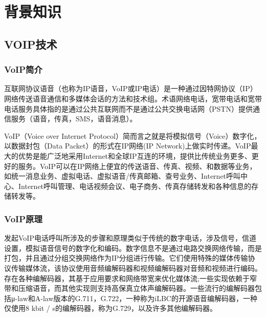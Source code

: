 \documentclass[a4paper,AutoFakeBold,oneside,12pt]{book}
\begin{document}
\blankmatter


% 

% 

% 

\frontmatter\tableofcontents %

\newpage\mainmatter
{}

\chapter{背景知识}

\section{VOIP技术}
\subsection{VoIP简介}
互联网协议语音（也称为IP语音，VoIP或IP电话）是一种通过因特网协议（IP）网络传送语音通信和多媒体会话的方法和技术组。术语网络电话，宽带电话和宽带电话服务具体指的是通过公共互联网而不是通过公共交换电话网（PSTN）提供通信服务（语音，传真，SMS，语音消息）。

VoIP（Voice over Internet Protocol）简而言之就是将模拟信号（Voice）数字化，以数据封包（Data Packet）的形式在IP网络(IP Network)上做实时传递。VoIP最大的优势是能广泛地采用Internet和全球IP互连的环境，提供比传统业务更多、更好的服务。VoIP可以在IP网络上便宜的传送语音、传真、视频、和数据等业务，如统一消息业务、虚拟电话、虚拟语音/传真邮箱、查号业务、Internet呼叫中心、Internet呼叫管理、电话视频会议、电子商务、传真存储转发和各种信息的存储转发等。

\subsection{VoIP原理}
发起VoIP电话呼叫所涉及的步骤和原理类似于传统的数字电话，涉及信号，信道设置，模拟语音信号的数字化和编码。数字信息不是通过电路交换网络传输，而是打包，并且通过分组交换网络作为IP分组进行传输。它们使用特殊的媒体传输协议传输媒体流，该协议使用音频编解码器和视频编解码器对音频和视频进行编码。存在各种编解码器，其基于应用要求和网络带宽来优化媒体流;一些实现依赖于窄带和压缩语音，而其他实现则支持高保真立体声编解码器。一些流行的编解码器包括μ-law和A-law版本的G.711，G.722，一种称为iLBC的开源语音编解码器，一种仅使用8 kbit / s的编解码器，称为G.729，以及许多其他编解码器。
\end{document}
